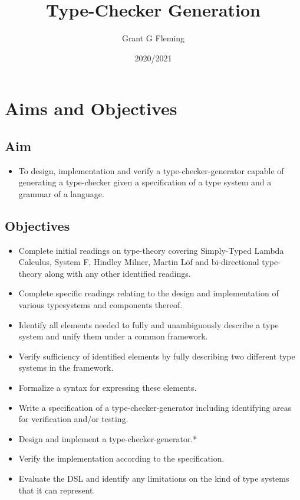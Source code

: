 \documentclass{ProgressReport}[2020/09/15]
\title{Type-Checker Generation}
\author{Grant G Fleming}
\date{2020/2021}
\begin{document}
        \maketitle
	\tableofcontents
        
        \chapter{Aims and Objectives}

        \section{Aim}

        \begin{itemize}
          \item To design, implementation and verify a
            type-checker-generator capable of generating a
            type-checker given a specification of a type system and a
            grammar of a language. 
        \end{itemize}
        
        \section{Objectives}

        \begin{itemize}
          \item Complete initial readings on type-theory covering
            Simply-Typed Lambda Calculus, System F, Hindley Milner,
            Martin L\"{o}f and bi-directional type-theory along with
            any other identified readings.
          \item Complete specific readings relating to the design and
            implementation of various typesystems and components thereof.
          \item Identify all elements needed to fully and
            unambiguously describe a type system and unify them under
            a common framework.
          \item Verify sufficiency of identified elements by fully describing
            two different type systems in the framework.
          \item Formalize a syntax for expressing these elements.
          \item Write a specification of a type-checker-generator
            including identifying areas for verification and/or
            testing. 
          \item Design and implement a type-checker-generator.*
          \item Verify the implementation according to the
            specification.
          \item Evaluate the DSL and identify any limitations on the
            kind of type systems that it can represent.
        \end{itemize}
\end{document}
